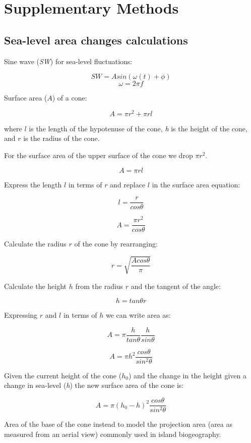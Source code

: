 \section*{Supplementary Methods}
\label{supplementary_methods}

\subsection*{Sea-level area changes calculations}

Sine wave (\textit{SW}) for sea-level fluctuations:


\[ SW = A sin(\omega(t) + \phi) \]    
\[ \omega = 2 \pi f \]

Surface area ($A$) of a cone:

\[ A = \pi r^2 + \pi r l \]

where $l$ is the length of the hypotenuse of the cone, \textit{h} is the height of the cone, and $r$ is the radius of the cone. 

For the surface area of the upper surface of the cone we drop $\pi r^2$.

\[ A = \pi r l \]

Express the length $l$ in terms of $r$ and replace $l$ in the surface area equation:

\[ l = \frac{r}{cos \theta} \]

\[ A = \frac{\pi r^2}{cos \theta} \]

Calculate the radius $r$ of the cone by rearranging: 

\[ r = \sqrt{\frac{A cos \theta}{\pi}} \]

Calculate the height $h$ from the radius $r$ and the tangent of the angle:

\[ h = tan \theta r \]

Expressing $r$ and $l$ in terms of $h$ we can write area as: 

\[ A = \pi \frac{h}{tan \theta} \frac{h}{sin \theta} \]

\[ A = \pi h^2 \frac{cos \theta}{sin^2 \theta} \]

Given the current height of the cone ($h_0$) and the change in the height given a change in sea-level (\textit{h}) the new surface area of the cone is:

\[ A = \pi (h_0 - h)^2 \frac{cos \theta}{sin^2 \theta} \]

Area of the base of the cone instead to model the projection area (area as measured from an aerial view) commonly used in island biogeography. \\

